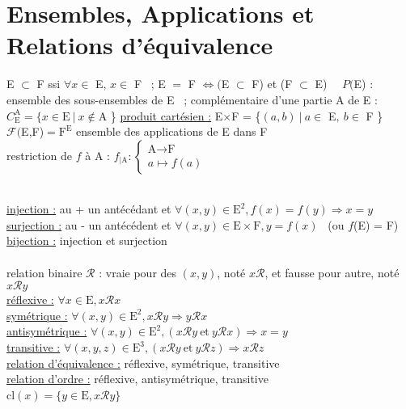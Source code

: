 \documentclass[12 pt]{exampleclass}
\begin{document}
\section{Ensembles, Applications et Relations d'équivalence}

\begin{flushleft}
\begin{doublespace}

	E $\subset$ F ssi $\forall x \in$ E, $x \in$ F \ ; E $=$ F $\Leftrightarrow ($E $\subset$ F) et (F $\subset$ E) \ \ 
	$P($E) : ensemble des sous-ensembles de E \ ; complémentaire d'une partie A de E : $C_\text{E}^\text{A} = \{ x\in \text{E} \ | \ x\notin \text{A}$ \}
	\underline{produit cartésien :} E$\times$F = \{$(a,b) \ | \ a\in$ E$ , \  b \in$ F \} \\
	$\mathcal{F} ($E,F)$ = \text{F}^\text{E}$ ensemble des applications de E dans F \\
	restriction de $f$ à A : $f_{| \text{A}} : \left\{\begin{array}{ll} \text{A}\rightarrow \text{F}  \\  a \mapsto f(a) \end{array} \right.$
	
	\text{ } \\
	\underline{injection :} au + un antécédant et $\forall(x,y)\in \text{E}^2, f(x) = f(y) \Rightarrow x=y$\\
	\underline{surjection :} au - un antécédent et $\forall (x,y) \in \text{E}\times\text{F}, y=f(x)$ \ (ou $f$(E) = F)\\
	\underline{bijection :} injection et surjection\\
	
	\text{ } \\
	relation binaire $\mathcal{R}$ : vraie pour des $(x,y)$, noté $x\mathcal{R}$, et fausse pour autre, noté $x\mathcal{R}y$ \\
	\underline{réflexive :} $\forall x \in \text{E}, x\mathcal{R}x$ \\
	\underline{symétrique :} $\forall (x,y) \in \text{E}^2, x\mathcal{R}y \Rightarrow y\mathcal{R}x$ \\
	\underline{antisymétrique :} $\forall (x,y) \in \text{E}^2, (x\mathcal{R}y \ \text{et} \ y\mathcal{R}x ) \Rightarrow x=y$ \\
	\underline{transitive :} $\forall (x,y,z) \in \text{E}^3, (x\mathcal{R}y \ \text{et} \  y\mathcal{R}z) \Rightarrow x\mathcal{R}z$ \\
	\underline{relation d'équivalence :} réflexive, symétrique, transitive \\
	\underline{relation d'ordre :} réflexive, antisymétrique, transitive \\
	cl$(x) = \{y \in \text{E}, x\mathcal{R}y \}$ \\
	
\end{doublespace}
\end{flushleft}
\end{document}
